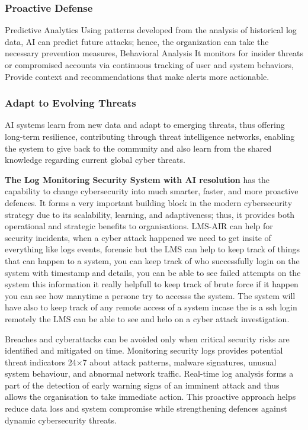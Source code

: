 \subsubsection{Proactive Defense}
Predictive Analytics Using patterns developed from the analysis of historical log data, AI can predict future attacks; hence, the organization can take the necessary prevention measures, Behavioral Analysis It monitors for insider threats or compromised accounts via continuous tracking of user and system behaviors, Provide context and recommendations that make alerts more actionable.

\subsubsection{Adapt to Evolving Threats}
AI systems learn from new data and adapt to emerging threats, thus offering long-term resilience, contributing through threat intelligence networks, enabling the system to give back to the community and also learn from the shared knowledge regarding current global cyber threats.


\textbf{The Log Monitoring Security System with AI resolution} has the capability to change cybersecurity into much smarter, faster, and more proactive defences. It forms a very important building block in the modern cybersecurity strategy due to its scalability, learning, and adaptiveness; thus, it provides both operational and strategic benefits to organisations. LMS-AIR can help for security incidents, when a cyber attack happened we need to get insite of everything like logs events, forensic but the LMS can help to keep track of things that can happen to a system, you can keep track of who successfully login on the system with timestamp and details, you can be able to see failed attempts on the system this information it really helpfull to keep track of brute force if it happen you can see how manytime a persone try to accesss the system. The system will have also to keep track of any remote access of a system incase the is a ssh login remotely the LMS can be able to see and helo on a cyber attack investigation.

Breaches and cyberattacks can be avoided only when critical security risks are identified and mitigated on time. Monitoring security logs provides potential threat indicators 24×7 about attack patterns, malware signatures, unusual system behaviour, and abnormal network traffic. Real-time log analysis forms a part of the detection of early warning signs of an imminent attack and thus allows the organisation to take immediate action. This proactive approach helps reduce data loss and system compromise while strengthening defences against dynamic cybersecurity threats\cite{muggler2018cybersecurity}.




